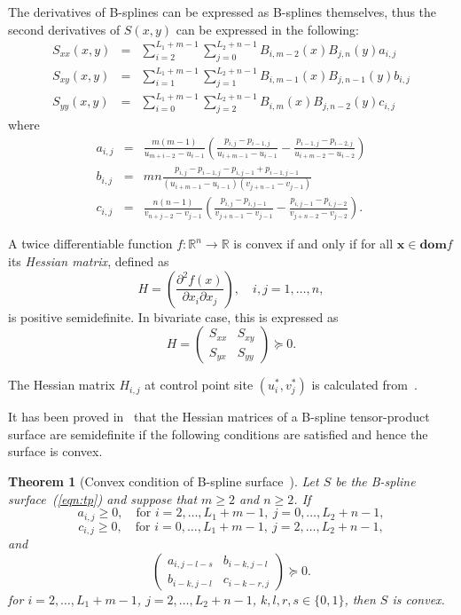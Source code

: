 \documentclass{sig-alternate}
\newcommand{\vectorx}{\mathbf{x}}
\newcommand{\setR}{\mathbb{R}}
\newtheorem{thm}{Theorem}
\begin{document}
The derivatives of B-splines can be expressed as B-splines
themselves, thus the second derivatives of $S(x,y)$ can be expressed
in the following:
\begin{eqnarray}
S_{xx}(x,y)&=&\sum_{i=2}^{L_1+m-1}{
          \sum_{j=0}^{L_2+n-1}{B_{i,m-2}(x)B_{j,n}(y) a_{i,j}}}
\nonumber\\
S_{xy}(x,y)&=&\sum_{i=1}^{L_1+m-1}{
          \sum_{j=1}^{L_2+n-1}{B_{i,m-1}(x)B_{j,n-1}(y) b_{i,j}}}
\nonumber\\
S_{yy}(x,y)&=&\sum_{i=0}^{L_1+m-1}{
          \sum_{j=2}^{L_2+n-1}{B_{i,m}(x)B_{j,n-2}(y) c_{i,j}}}
\nonumber
\end{eqnarray}
where 
\begin{eqnarray}
a_{i,j}&=&\frac{m(m-1)}{u_{m+i-2}-u_{i-1}}
      \left(\frac{p_{i,j}-p_{i-1,j}}{u_{i+m-1}-u_{i-1}}
           -\frac{p_{i-1,j}-p_{i-2,j}}{u_{i+m-2}-u_{i-2}}\right)\nonumber\\
b_{i,j}&=&mn\frac{p_{i,j}-p_{i-1,j}-p_{i,j-1}+p_{i-1,j-1}}
                {(u_{i+m-1}-u_{i-1})(v_{j+n-1}-v_{j-1})}\nonumber\\
c_{i,j}&=&\frac{n(n-1)}{v_{n+j-2}-v_{j-1}}
      \left(\frac{p_{i,j}-p_{i,j-1}}{v_{j+n-1}-v_{j-1}}
           -\frac{p_{i,j-1}-p_{i,j-2}}{v_{j+n-2}-v_{j-2}}\right).\nonumber
\end{eqnarray}


A twice differentiable function $f:\setR^n\to\setR$ is convex if and
only if for all $\vectorx\in \mathbf{dom}f$ its \emph{Hessian matrix}, 
defined as 
\[H=\left(\frac{\partial^2 f(x)}{\partial x_i \partial x_j}\right),
\quad i,j=1,\ldots,n,\]
is positive semidefinite. 
In bivariate case, this is expressed as  
\[H=\left(\begin{array}{cc}
S_{xx} & S_{xy} \\ S_{yx} & S_{yy}
\end{array}\right) \succeq 0.\]

The Hessian matrix $H_{i,j}$ at control point site
$(u_i^*,v_j^*)$ is calculated from~\cite{Floater_93}.

It has been proved in~\cite{Floater_93} that the Hessian matrices of a
B-spline tensor-product surface are semidefinite if the following
conditions are satisfied and hence the surface is convex.
\begin{thm}[Convex condition of B-spline surface~\cite{Floater_93}]
\label{thm:weak}
Let $S$ be the B-spline surface~(\ref{eqn:tp}) and suppose that $m\geq
2$ and $n\geq 2$. If
\[a_{i,j}\geq 0,\quad \mbox{for }i=2,\ldots,L_1+m-1,
                                ~j=0,\ldots,L_2+n-1,\]
\[c_{i,j}\geq 0,\quad \mbox{for }i=0,\ldots,L_1+m-1,
                                ~j=2,\ldots,L_2+n-1,\]
and
\[\left(\begin{array}{cc}
a_{i,j-l-s} & b_{i-k,j-l} \\ b_{i-k,j-l} & c_{i-k-r,j}
\end{array}\right) \succeq 0.\]
for $i=2,\ldots,L_1+m-1$, $j=2,\ldots,L_2+n-1$, $k,l,r,s\in\{0,1\}$,
then $S$ is convex.
\end{thm}
\end{document}

